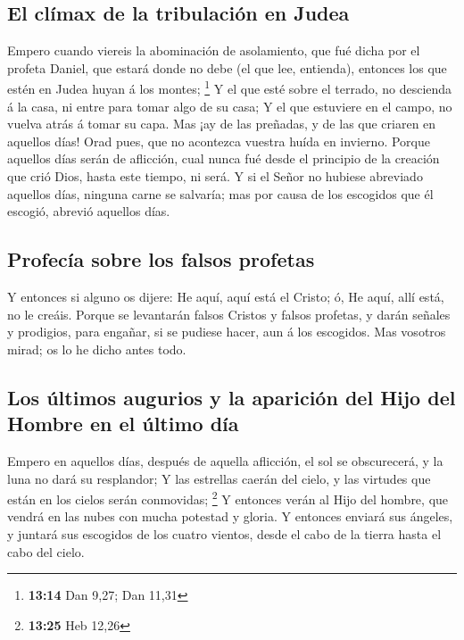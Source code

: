 \hypertarget{el-cluxedmax-de-la-tribulaciuxf3n-en-judea}{%
\subsection{El clímax de la tribulación en
Judea}\label{el-cluxedmax-de-la-tribulaciuxf3n-en-judea}}

 Empero cuando viereis la abominación de asolamiento, que
fué dicha por el profeta Daniel, que estará donde no debe (el que lee,
entienda), entonces los que estén en Judea huyan á los montes;
\footnote{\textbf{13:14} Dan 9,27; Dan 11,31}  Y el que
esté sobre el terrado, no descienda á la casa, ni entre para tomar algo
de su casa;  Y el que estuviere en el campo, no vuelva
atrás á tomar su capa.  Mas ¡ay de las preñadas, y de las
que criaren en aquellos días!  Orad pues, que no acontezca
vuestra huída en invierno.  Porque aquellos días serán de
aflicción, cual nunca fué desde el principio de la creación que crió
Dios, hasta este tiempo, ni será.  Y si el Señor no hubiese
abreviado aquellos días, ninguna carne se salvaría; mas por causa de los
escogidos que él escogió, abrevió aquellos días.

\hypertarget{profecuxeda-sobre-los-falsos-profetas}{%
\subsection{Profecía sobre los falsos
profetas}\label{profecuxeda-sobre-los-falsos-profetas}}

 Y entonces si alguno os dijere: He aquí, aquí está el
Cristo; ó, He aquí, allí está, no le creáis.  Porque se
levantarán falsos Cristos y falsos profetas, y darán señales y
prodigios, para engañar, si se pudiese hacer, aun á los escogidos.
 Mas vosotros mirad; os lo he dicho antes todo.

\hypertarget{los-uxfaltimos-augurios-y-la-apariciuxf3n-del-hijo-del-hombre-en-el-uxfaltimo-duxeda}{%
\subsection{Los últimos augurios y la aparición del Hijo del Hombre en
el último
día}\label{los-uxfaltimos-augurios-y-la-apariciuxf3n-del-hijo-del-hombre-en-el-uxfaltimo-duxeda}}

 Empero en aquellos días, después de aquella aflicción, el
sol se obscurecerá, y la luna no dará su resplandor;  Y las
estrellas caerán del cielo, y las virtudes que están en los cielos serán
conmovidas; \footnote{\textbf{13:25} Heb 12,26}  Y entonces
verán al Hijo del hombre, que vendrá en las nubes con mucha potestad y
gloria.  Y entonces enviará sus ángeles, y juntará sus
escogidos de los cuatro vientos, desde el cabo de la tierra hasta el
cabo del cielo.

